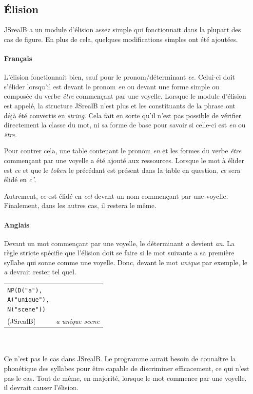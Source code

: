 \documentclass[11pt]{article} %
\newcommand{\system}[1]{\textsf{#1}}
\newcommand{\JSB}{\system{JSrealB}}
\newcommand{\real}[1]{\emph{#1}}
\begin{document}
\subsection{Élision}

\JSB{} a un module d'élision assez simple qui fonctionnait dans la plupart des cas de figure.
En plus de cela, quelques modifications simples ont été ajoutées.
\paragraph{Français}
L'élision fonctionnait bien, sauf pour le pronom/déterminant \emph{ce}. Celui-ci doit
s'élider lorsqu'il est devant le pronom \emph{en} ou devant une forme simple ou composée
du verbe \emph{être} commençant par une voyelle. Lorsque le module d'élision est appelé, la structure \JSB{} n'est plus 
et les constituants de la phrase ont déjà été convertis en \emph{string}. Cela fait en sorte
qu'il n'est pas possible de vérifier directement la classe du mot, ni sa forme de base pour savoir
si celle-ci est \emph{en} ou \emph{être}. 

Pour contrer cela, une table contenant le pronom \emph{en}
et les formes du verbe \emph{être} commençant par une voyelle a été ajouté aux ressources.
Lorsque le mot à élider est \emph{ce} et que le \emph{token} le précédant est présent
dans la table en question, \emph{ce} sera élidé en \emph{c'}. 

Autrement, \emph{ce} est
élidé en \emph{cet} devant un nom commençant par une voyelle. Finalement, dans les autres cas, 
il restera le même.

\paragraph{Anglais}
Devant un mot commençant par une voyelle, le déterminant \emph{a} devient \emph{an}.
La règle stricte spécifie que l'élision doit se faire si le mot suivante a sa première
syllabe qui sonne comme une voyelle. Donc, devant le mot \emph{unique} par exemple,
le \emph{a} devrait rester tel quel. \\
\begin{tabular}{p{4.5cm} p{8cm}}
\begin{alltt}
NP(D("a"),
   A("unique"),
   N("scene"))
\end{alltt} &
\begin{alltt}
\end{alltt} \\
\real{\color{red}{an unique scene}} (\JSB{}) & \real{\color{green}a unique scene}
\end{tabular}
\\
\\
Ce n'est pas le cas dans \JSB{}. Le programme aurait 
besoin de connaître la phonétique des syllabes pour être capable de discriminer
efficacement, ce qui n'est pas le cas. Tout de même, en majorité, lorsque le mot commence
par une voyelle, il devrait causer l'élision.
\end{document}
